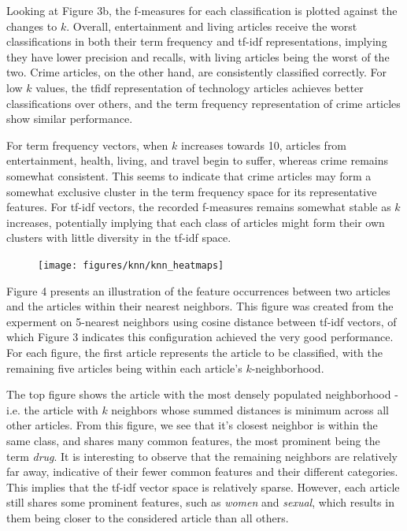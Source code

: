 \documentclass[11pt]{article}
\begin{document}
Looking at Figure 3b, the f-measures for each classification is plotted against the changes to $k$.
Overall, entertainment and living articles receive the worst classifications in both their term frequency and tf-idf representations, implying they have lower precision and recalls, with living articles being the worst of the two.
Crime articles, on the other hand, are consistently classified correctly.
For low $k$ values, the tfidf representation of technology articles achieves better classifications over others, and the term frequency representation of crime articles show similar performance.

For term frequency vectors, when $k$ increases towards 10, articles from entertainment, health, living, and travel begin to suffer, whereas crime remains somewhat consistent.
This seems to indicate that crime articles may form a somewhat exclusive cluster in the term frequency space for its representative features.
For tf-idf vectors, the recorded f-measures remains somewhat stable as $k$ increases, potentially implying that each class of articles might form their own clusters with little diversity in the tf-idf space.

\begin{figure}[h!] \label{fig:heatmap_neighborhoods}
  \centering
  \texttt{[image: figures/knn/knn\_heatmaps]}
  \caption{}
\end{figure}

Figure 4 presents an illustration of the feature occurrences between two articles and the articles within their nearest neighbors.
This figure was created from the experment on 5-nearest neighbors using cosine distance between tf-idf vectors, of which Figure 3 indicates this configuration achieved the very good performance.
For each figure, the first article represents the article to be classified, with the remaining five articles being within each article's $k$-neighborhood.

The top figure shows the article with the most densely populated neighborhood - i.e. the article with $k$ neighbors whose summed distances is minimum across all other articles.
From this figure, we see that it's closest neighbor is within the same class, and shares many common features, the most prominent being the term \emph{drug}.
It is interesting to observe that the remaining neighbors are relatively far away, indicative of their fewer common features and their different categories.
This implies that the tf-idf vector space is relatively sparse.
However, each article still shares some prominent features, such as \emph{women} and \emph{sexual}, which results in them being closer to the considered article than all others.
\end{document}
